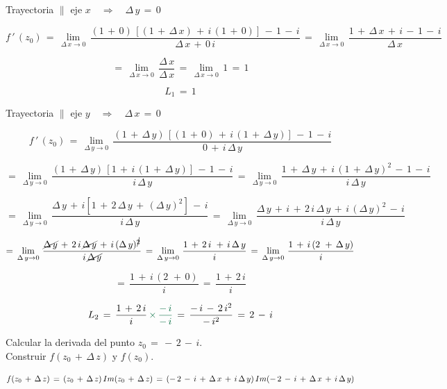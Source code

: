 \documentclass[a4paper,11pt,openany]{book}
\begin{document}
\textcolor{ao(english)}{} Trayectoria $\parallel$ eje $x \quad\Rightarrow\quad \Delta\,y\,=\,0$

$$f\,'\,(z_{0})\,=\,\displaystyle\lim_{\Delta\,x \to 0}\,\dfrac{(1\,+\,0)\,\left[(1\,+\,\Delta\,x)\,+\,i\,(1\,+\,0)\right]\,-\,1\,-\,i}{\Delta\,x\,+\,0\,i}\,=\,\displaystyle\lim_{\Delta\,x \to 0}\,\dfrac{1\,+\,\Delta\,x\,+\,i\,-\,1\,-\,i}{\Delta\,x}$$

$$=\,\displaystyle\lim_{\Delta\,x \to 0}\,\dfrac{\Delta\,x}{\Delta\,x}\,=\,\displaystyle\lim_{\Delta\,x \to 0}\,1\,=\,1$$

$$L_{1}\,=\,1$$

\textcolor{ao(english)}{} Trayectoria $\parallel$ eje $y \quad\Rightarrow\quad \Delta\,x\,=\,0$

$$f\,'\,(z_{0})\,=\,\displaystyle\lim_{\Delta\,y \to 0}\,\dfrac{(1\,+\,\Delta\,y)\,\left[(1\,+\,0)\,+\,i\,(1\,+\,\Delta\,y)\right]\,-\,1\,-\,i}{0\,+\,i\,\Delta\,y}$$

$$=\,\displaystyle\lim_{\Delta\,y \to 0}\,\dfrac{(1\,+\,\Delta\,y)\,\left[1\,+\,i\,(1\,+\,\Delta\,y)\right]\,-\,1\,-\,i}{i\,\Delta\,y}\,=\,\displaystyle\lim_{\Delta\,y \to 0}\,\dfrac{1\,+\,\Delta\,y\,+\,i\,(1\,+\,\Delta\,y)^{2}\,-\,1\,-\,i}{i\,\Delta\,y}$$

$$=\,\displaystyle\lim_{\Delta\,y \to 0}\,\dfrac{\Delta\,y\,+\,i[1\,+\,2\,\Delta\,y\,+\,(\Delta\,y)^{2}]\,-\,i}{i\,\Delta\,y}\,=\,\displaystyle\lim_{\Delta\,y \to 0}\,\dfrac{\Delta\,y\,+\,i\,+\,2\,i\,\Delta\,y\,+\,i\,(\Delta\,y)^{2}\,-\,i}{i\,\Delta\,y}$$

$$=\,\displaystyle\lim_{\Delta\,y \to 0}\,\dfrac{\cancel{\Delta\,y}\,+\,2\,i\,\cancel{\Delta\,y}\,+\,i\,(\Delta\,y)^{\cancel{2}}}{i\,\cancel{\Delta\,y}}\,=\,\displaystyle\lim_{\Delta\,y \to 0}\,\dfrac{1\,+\,2\,i\,\,+\,i\,\Delta\,y}{i}\,=\,\displaystyle\lim_{\Delta\,y \to 0}\,\dfrac{1\,+\,i\,(2\,\,+\,\Delta\,y)}{i}$$

$$=\,\dfrac{1\,+\,i\,(2\,\,+\,0)}{i}\,=\,\dfrac{1\,+\,2\,i}{i}$$

$$L_{2}\,=\,\dfrac{1\,+\,2\,i}{i}\,\textcolor{cadmiumgreen}{\times\,\dfrac{-\,i}{-\,i}}\,=\,\dfrac{-\,i\,-\,2\,i^{2}}{-\,i^{2}}\,=\,2\,-\,i$$

\textcolor{ao(english)}{} Calcular la derivada del punto $z_{0}\,=\,-\,2\,-\,i$.\\

\textcolor{ao(english)}{} Construir $f(z_{0}\,+\,\Delta\,z)$ y $f(z_{0})$.

$$f(z_{0}\,+\,\Delta\,z)\,=\,(z_{0}\,+\,\Delta\,z)\,\mathnormal{Im}(z_{0}\,+\,\Delta\,z)\,=\,(-\,2\,-\,i\,+\,\Delta\,x\,+\,i\,\Delta\,y)\,\mathnormal{Im}(-\,2\,-\,i\,+\,\Delta\,x\,+\,i\,\Delta\,y)$$
\end{document}
